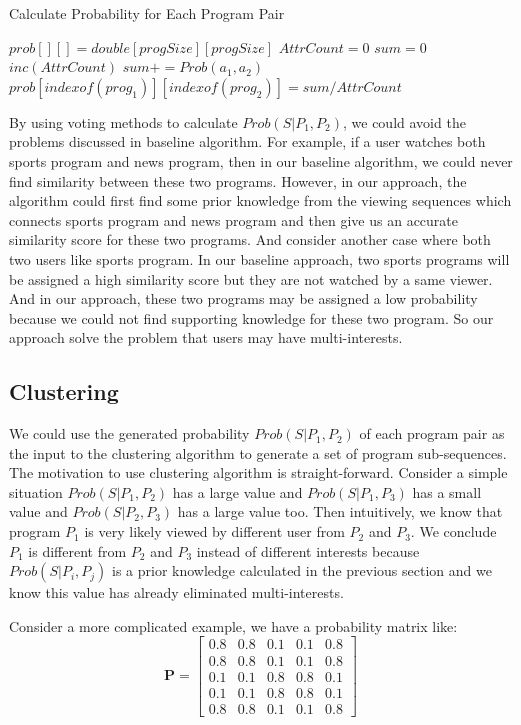 \begin{algorithm}[htb]
\caption{Calculate Probability for Each Program Pair}
\label{algo:4}
\begin{algorithmic}[1]
\STATE $prob[][] = double[progSize][progSize]$
\STATE $AttrCount=0$
\STATE $sum = 0$
\STATE $inc(AttrCount)$
\STATE $sum += Prob(a_1,a_2)$
\ENDFOR
\ENDFOR
\STATE $prob[indexof(prog_1)][indexof(prog_2)]=sum/AttrCount$
\ENDFOR
\ENDFOR
\end{algorithmic}
\end{algorithm}

By using voting methods to calculate $Prob(S|P_1,P_2)$, we could avoid the problems discussed in baseline algorithm. For example, if a user watches both sports program
and news program, then in our baseline algorithm, we could never find similarity between these two programs. However, in our approach, the algorithm could first find
some prior knowledge from the viewing sequences which connects sports program and news program and then give us an accurate similarity score for these two programs.
And consider another case where both two users like sports program. In our baseline approach, two sports programs will be assigned a high similarity score but they
are not watched by a same viewer. And in our approach, these two programs may be assigned a low probability because we could not find supporting knowledge for these
two program. So our approach solve the problem that users may have multi-interests.

\subsection{Clustering}
We could use the generated probability $Prob(S|P_1,P_2)$ of each program pair as the input to the clustering algorithm to generate a set of program sub-sequences.
The motivation to use clustering algorithm is straight-forward. Consider a simple situation $Prob(S|P_1,P_2)$ has a large value and $Prob(S|P_1,P_3)$ has a small
value and $Prob(S|P_2,P_3)$ has a large value too. Then intuitively, we know that program $P_1$ is very likely viewed by different user from $P_2$ and $P_3$.
We conclude $P_1$ is different from $P_2$ and $P_3$ instead of different interests because $Prob(S|P_i,P_j)$ is a prior knowledge calculated in the previous
section and we know this value has already eliminated multi-interests.

Consider a more complicated example, we have a probability matrix like:
\begin{equation}
\boldsymbol{P}=
\begin{bmatrix}
0.8 & 0.8 & 0.1 & 0.1 & 0.8 \\
0.8 & 0.8 & 0.1 & 0.1 & 0.8 \\
0.1 & 0.1 & 0.8 & 0.8 & 0.1 \\
0.1 & 0.1 & 0.8 & 0.8 & 0.1 \\
0.8 & 0.8 & 0.1 & 0.1 & 0.8
\end{bmatrix}
\end{equation}


